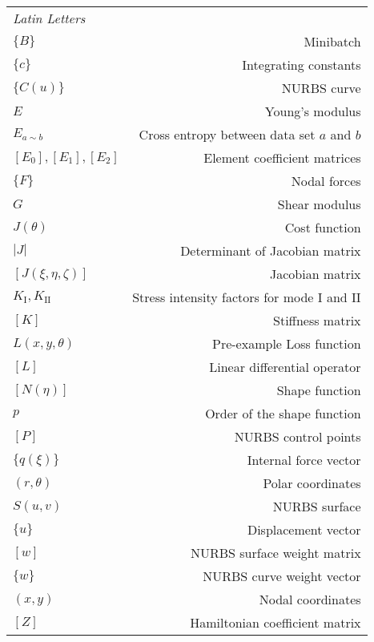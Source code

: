\begin{longtable}{lr}
        {\it Latin Letters}                 &   \\
        $\{B\}$                             &   Minibatch   \\
        $\{c\}$                             &   Integrating constants   \\
        $\{C(u)\}$                          &   NURBS curve \\
        $E$                                 &   Young's modulus \\
        $E_{a \sim b}$                      &   Cross entropy between data set $a$ and $b$  \\
        $[E_0], [E_1], [E_2]$               &   Element coefficient matrices    \\
        $\{F\}$                             &   Nodal forces    \\
        $G$                                 &   Shear modulus   \\
        $J(\theta)$                         &   Cost function   \\
        $|J|$                               &   Determinant of Jacobian matrix  \\
        $[J(\xi, \eta, \zeta)]$             &   Jacobian matrix \\
        $K_{\mathrm{I}}, K_{\mathrm{II}}$   &   Stress intensity factors for mode $\mathrm{I}$ and $\mathrm{II}$    \\
        $[K]$                               &   Stiffness matrix    \\
        $L(x, y, \theta)$                   &   Pre-example Loss function   \\
        $[L]$                               &   Linear differential operator    \\
        $[N(\eta)]$                         &   Shape function  \\
        $p$                                 &   Order of the shape function \\
        $[P]$                               &   NURBS control points    \\
        $\{q(\xi)\}$                        &   Internal force vector   \\
        $(r, \theta)$                       &   Polar coordinates   \\
        ${S(u, v)}$                         &   NURBS surface   \\
        $\{ u \}$                           &   Displacement vector \\
        $[w]$                               &   NURBS surface weight matrix \\
        $\{w\}$                             &   NURBS curve weight vector   \\
        $(x,y)$                             &   Nodal coordinates   \\
        $[Z]$                               &   Hamiltonian coefficient matrix  \\
\end{longtable}

\renewcommand{\arraystretch}{1}

\tableofcontents
\listoftables
{}
\listoffigures
{}